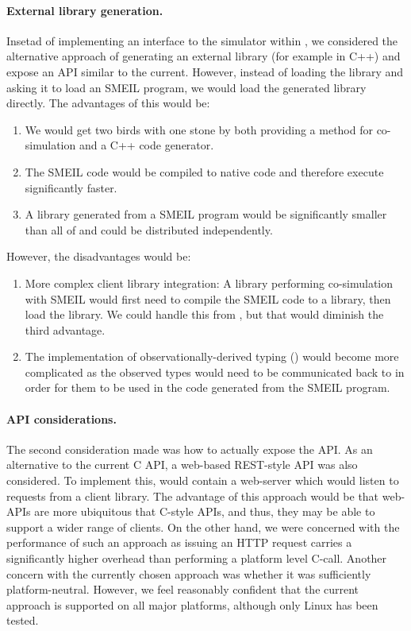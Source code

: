 \paragraph{External library generation.}
Insetad of implementing an interface to the simulator within \libsme{}, we
considered the alternative approach of generating an external library (for
example in C++) and expose an API similar to the current. However, instead of
loading the \libsme{} library and asking it to load an SMEIL program, we would
load the generated library directly. The advantages of this would be:
\begin{enumerate}
\item We would get two birds with one stone by both providing a method for
  co-simulation and a C++ code generator.
\item The SMEIL code would be compiled to native code and therefore execute
  significantly faster.
\item A library generated from a SMEIL program would be significantly smaller
  than all of \libsme{} and could be distributed independently.
\end{enumerate}
However, the disadvantages would be:
\begin{enumerate}
\item More complex client library integration: A library performing
  co-simulation with SMEIL would first need to compile the SMEIL code to a
  library, then load the library. We could handle this from \libsme{}, but that
  would diminish the third advantage.
\item The implementation of observationally-derived typing ()
  would become more complicated as the observed types would need to be
  communicated back to \libsme{} in order for them to be used in the code
  generated from the SMEIL program.
\end{enumerate}
    
\paragraph{API considerations.}
The second consideration made was how to actually expose the API. As an
alternative to the current C API, a web-based REST-style API was also
considered. To implement this, \libsme{} would contain a web-server which would
listen to requests from a client library. The advantage of this approach would
be that web-APIs are more ubiquitous that C-style APIs, and thus, they may be
able to support a wider range of clients. On the other hand, we were concerned
with the performance of such an approach as issuing an HTTP request carries a
significantly higher overhead than performing a platform level C-call. Another
concern with the currently chosen approach was whether it was sufficiently
platform-neutral. However, we feel reasonably confident that the current
approach is supported on all major platforms, although only Linux has been
tested.


